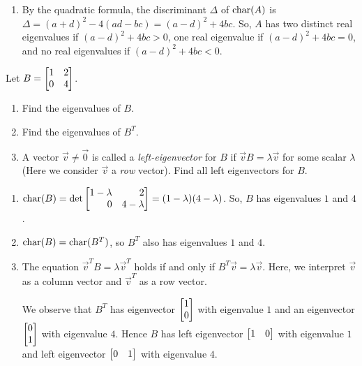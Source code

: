 \begin{exercises}
\begin{problist}
\begin{solution}
\begin{enumerate}
				\item By the quadratic formula, the discriminant $\Delta$ of
					$\operatorname{char}(A)$ is $\Delta = (a + d)^{2} - 4(ad - bc) =
					(a - d)^{2} + 4 bc$. So, $A$ has two distinct real
					eigenvalues if $(a - d)^{2} + 4bc > 0$, one real eigenvalue
					if $(a - d)^{2} + 4bc = 0$, and no real
					eigenvalues if $(a - d)^{2} + 4bc < 0.$
			\end{enumerate}
		\end{solution}

		\prob Let $B=\mat{1&2\\0&4}$.
		\begin{enumerate}
			\item Find the eigenvalues of $B$.

			\item Find the eigenvalues of $B^{T}$.

			\item A vector $\vec v\neq\vec 0$ is called a \emph{left-eigenvector}
				for $B$ if $\vec vB=\lambda \vec v$ for some scalar
				$\lambda$ (Here we consider $\vec v$ a \emph{row} vector).
				Find all left eigenvectors for $B$.
		\end{enumerate}


		\begin{solution}

			\begin{enumerate}
				\item $\Char(B) = \det\mat{1 -\lambda & 2 \\ 0 & 4 - \lambda}=
					(1 - \lambda)(4 - \lambda)$. So, $B$ has
					eigenvalues $1$ and $4$.

				\item $\operatorname{char}(B) = \operatorname{char}(B^{T})$, so $B^{T}$ also has
					eigenvalues $1$ and $4$.

				\item The equation $\vec{v}^{T}B = \lambda \vec{v}^{T}$ holds if and only if $B^{T}
					\vec{v}= \lambda \vec{v}$. Here, we interpret $\vec{v}$ as
					a column vector and $\vec{v}^{T}$ as a 
					row vector.

					We observe that $B^{T}$ has eigenvector
					$\mat{1 \\ 0}$ with eigenvalue $1$ and an eigenvector
					$\mat{0\\1}$ with eigenvalue $4$. Hence $B$ has
					left eigenvector $\mat{1 & 0}$ with eigenvalue $1$
					and left eigenvector $\mat{0 & 1}$ with eigenvalue
					$4$.
			\end{enumerate}
		\end{solution}


\end{problist}
\end{exercises}
